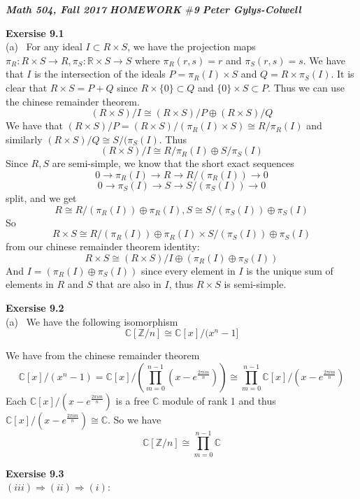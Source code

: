 \documentclass[12pt]{article}
\newenvironment{ques}[1]{\textbf{Exersise #1}\vspace{1 mm}\\ }{\bigskip}
\theoremstyle{definition}
\renewcommand{\l}{\left }
\renewcommand{\r}{\right }
\newcommand{\R}{\mathbb R}
\newcommand{\Z}{\mathbb Z}
\newcommand{\C}{\mathbb C}
\begin{document}
\noindent \textit{\textbf{Math 504, Fall 2017}} \hspace{1.3cm}
\textit{\textbf{HOMEWORK $\#$9}} \hspace{1.3cm} \textit{\textbf{Peter
Gylys-Colwell}} 

\vspace{1cm}

\begin{ques}{9.1}
	(a) \ For any ideal $I \subset R \times S$, we have the projection maps
	$\pi_R:R\times S \to R, \pi_S: \R \times S \to S$ where $\pi_R(r,s) = r$
	and $\pi_S(r,s) = s$. We have that $I$ is the intersection of the ideals $P
	= \pi_R(I) \times S$ and $Q = R \times \pi_S(I)$. It is clear that $R
	\times S = P + Q$ since $R \times \{0\} \subset Q$ and $\{0\} \times S
	\subset P$. Thus we can use the chinese remainder theorem.
	$$(R \times S)/I \cong (R \times S) / P \oplus (R \times S)/ Q$$
	We have that $(R \times S)/ P = (R \times S) / (\pi_R(I) \times S) \cong R
	/ \pi_R(I)$ and similarly $(R \times S)/Q \cong S/(\pi_S(I)$. Thus
	$$(R \times S)/I \cong R/\pi_R(I) \oplus S/\pi_S(I)$$
	Since $R, S$ are semi-simple, we know that the short exact sequences
	$$0 \to \pi_R(I) \to R \to R/(\pi_R(I)) \to 0$$
	$$0 \to \pi_S(I) \to S \to S/(\pi_S(I)) \to 0$$
	split, and we get
	$$R \cong R/(\pi_R(I)) \oplus \pi_R(I), S \cong  S/(\pi_S(I)) \oplus \pi_S(I)$$
	So
	$$R \times S \cong R/(\pi_R(I)) \oplus \pi_R(I) \times S/(\pi_S(I)) \oplus
	\pi_S(I)$$
	from our chinese remainder theorem identity:
	$$R \times S \cong (R \times S)/I \oplus (\pi_R(I) \oplus \pi_S(I))$$
	And $I =  (\pi_R(I) \oplus \pi_S(I))$ since every element in $I$ is the
	unique sum of elements in $R$ and $S$ that are also in $I$, thus $R \times
	S$ is semi-simple.
\end{ques}

\begin{ques}{9.2}
	(a) \ We have the following isomorphism
	$$\C[\Z/n] \cong \C[x]/(x^n - 1]$$

	We have from the chinese remainder theorem 
	$$\C[x]/(x^n - 1) = \C[x]/\l(\prod_{m=0}^{n-1} (x - e^{\frac{2\pi im}{n}})
	\r) \cong \prod_{m=0}^{n-1} \C[x]/ (x - e^{\frac{2\pi im}{n}})$$
	Each $\C[x]/ (x - e^{\frac{2\pi im}{n}})$ is a free $\C$ module of rank 1
	and thus $\C[x]/ (x - e^{\frac{2\pi im}{n}}) \cong \C$. So we have 
	$$\C[\Z/n] \cong \prod_{m=0}^{n-1} \C$$
\end{ques}

\begin{ques}{9.3}
	$(iii) \Rightarrow (ii) \Rightarrow (i)$:\\

\end{ques}
\end{document}
